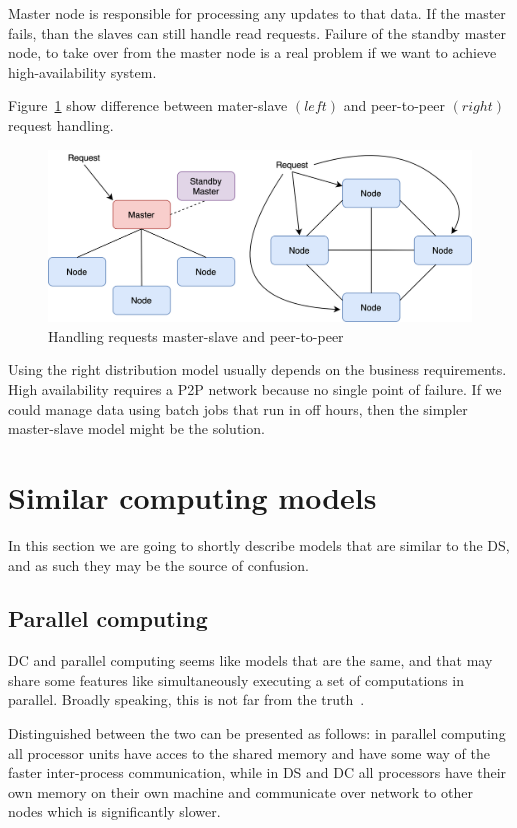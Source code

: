 Master node is responsible for processing any updates to that data. If the master fails, than  the slaves can still handle read requests. Failure of the standby master node, to take over from the master node is a real problem if we want to achieve high-availability system.

Figure~\ref{fig:fig16} show difference between mater-slave $(left)$ and peer-to-peer $(right)$ request handling.

\begin{figure}[H]
	\begin{center}
		\includegraphics[scale=0.7]{images/Figure16.png}
	\end{center}
	\vspace{-0.6cm}
	\caption{Handling requests master-slave and peer-to-peer}
	\label{fig:fig16}
\end{figure}

Using the right distribution model usually depends on the business requirements. High availability requires a P2P network because no single point of failure. If we could manage data using batch jobs that run in off hours, then the simpler master-slave model might be the solution.
%
%
\section{Similar computing models}\label{sec:similar_models}
%
In this section we are going to shortly describe models that are similar to the DS, and as such they may be the source of confusion.
%
%
\subsection{Parallel computing}\label{sec:parallel_computing}
%
DC and parallel computing seems like models that are the same, and that may share some features like simultaneously executing a set of computations in parallel. Broadly speaking, this is not far from the truth~\cite{Vera16}. 

Distinguished between the two can be presented as follows: in parallel computing all processor units have acces to the shared memory and have some way of the faster inter-process communication, while in DS and DC all processors have their own memory on their own machine and communicate over network to other nodes which is significantly slower. 

